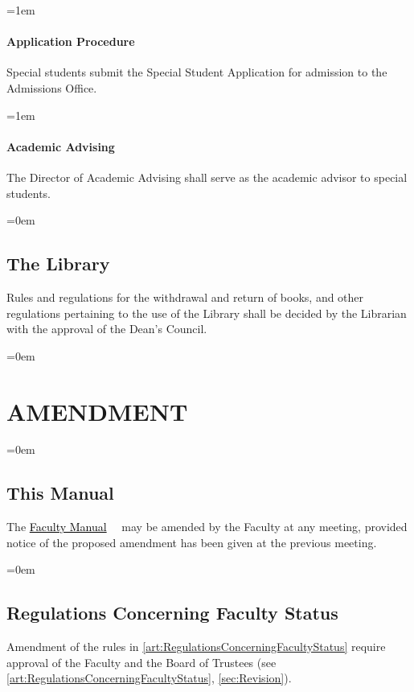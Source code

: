 \documentclass{manual}
\newcommand{\oldbreak}[1]{}
\let\stdsection\section %
\renewcommand\section{\newpage\stdsection}
\newcommand{\keyword}[1]{\textcolor{black}{#1}}
\newcommand{\facman}{\keyword{\underline{Faculty Manual}}~}
\let\oldsection\section
\renewcommand\section{\leftskip=0em\oldsection}
\let\oldsubsection\subsection
\renewcommand\subsection{\leftskip=0em\oldsubsection}
\let\oldparagraph\paragraph
\renewcommand\paragraph{\leftskip=1em\oldparagraph}
\begin{document}
\paragraph{Application Procedure}

Special students submit the Special Student Application for admission to the Admissions Office.

\paragraph{Academic Advising}

The Director of Academic Advising shall serve as the academic advisor to special students.

\oldbreak{X-2}

\subsection{The Library}

Rules and regulations for the withdrawal and return of books, and other regulations pertaining to the use of the Library shall be decided by the Librarian with the approval of the Dean's Council.

\section{AMENDMENT}\label{art:Amendment}

\subsection{This Manual}
The \facman~ may be amended by the Faculty at any meeting, provided notice of the proposed amendment has been given at the previous meeting.

\subsection{Regulations Concerning Faculty Status}
Amendment of the rules in \cref{art:RegulationsConcerningFacultyStatus} require approval of the Faculty and the Board of Trustees (see \cref{art:RegulationsConcerningFacultyStatus}, \cref{sec:Revision}).
\end{document}

